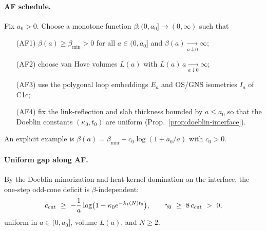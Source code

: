 \documentclass[11pt]{amsart}
\begin{document}
\paragraph{AF schedule.}
Fix $a_0>0$. Choose a monotone function $\beta:(0,a_0]\to (0,\infty)$ such that
\begin{itemize}
  \item[(AF1)] $\beta(a)\ge \beta_{\min}>0$ for all $a\in(0,a_0]$ and $\beta(a)\xrightarrow[a\downarrow 0]{}\infty$;
  \item[(AF2)] choose van Hove volumes $L(a)$ with $L(a)\,a\xrightarrow[a\downarrow 0]{}\infty$;
  \item[(AF3)] use the polygonal loop embeddings $E_a$ and OS/GNS isometries $I_a$ of C1c;
  \item[(AF4)] fix the link-reflection and slab thickness bounded by $a\le a_0$ so that the Doeblin constants $(\kappa_0,t_0)$ are uniform (Prop.~\ref{prop:doeblin-interface}).
\end{itemize}
An explicit example is $\beta(a)=\beta_{\min}+c_0\log(1+a_0/a)$ with $c_0>0$.

\paragraph{Uniform gap along AF.}
By the Doeblin minorization and heat-kernel domination on the interface, the one-step odd-cone deficit is $\beta$-independent:
\[
  c_{\rm cut}\ \ge\ -\frac{1}{a}\log\bigl(1-\kappa_0 e^{-\lambda_1(N) t_0}\bigr),\qquad
  \gamma_0\ \ge\ 8\,c_{\rm cut}\ >\ 0,
\]
uniform in $a\in(0,a_0]$, volume $L(a)$, and $N\ge 2$.
\end{document}

